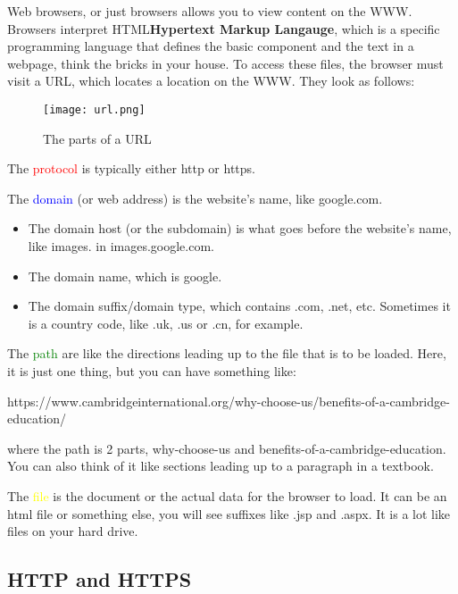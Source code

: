 \documentclass[../main.tex]{subfiles}
\begin{document}
Web browsers, or just browsers allows you to view content on the WWW. Browsers interpret HTML\textbf{Hypertext Markup Langauge}, which is a specific programming language that defines the basic component and the text in a webpage, think the bricks in your house. To access these files, the browser must visit a URL, which locates a location on the WWW. They look as follows:

\begin{figure}[H]
    \centering
    \texttt{[image: url.png]}
    \caption{The parts of a URL}
    \label{fig:url}
\end{figure}

The \textcolor{red}{protocol} is typically either {\ccmono http} or {\ccmono https}.

The \textcolor{blue}{domain} (or web address) is the website's name, like {\ccmono google.com}. 
\begin{itemize}
    \item The domain host (or the subdomain) is what goes before the website's name, like {\ccmono images.} in {\ccmono images.google.com}.
    \item The domain name, which is {\ccmono google}.
    \item The domain suffix/domain type, which contains {\ccmono .com}, {\ccmono .net}, etc. Sometimes it is a country code, like {\ccmono .uk}, {\ccmono .us} or {\ccmono .cn}, for example.
\end{itemize}

The \textcolor{green}{path} are like the directions leading up to the file that is to be loaded. Here, it is just one thing, but you can have something like:

{\ccmono https://www.cambridgeinternational.org/why-choose-us/benefits-of-a-cambridge-education/}

where the path is 2 parts, {\ccmono why-choose-us} and {\ccmono benefits-of-a-cambridge-education}. You can also think of it like sections leading up to a paragraph in a textbook. 

The \textcolor{yellow}{file} is the document or the actual data for the browser to load. It can be an html file or something else, you will see suffixes like {\ccmono .jsp} and {\ccmono .aspx}. It is a lot like files on your hard drive.

\subsection{HTTP and HTTPS}
\end{document}
